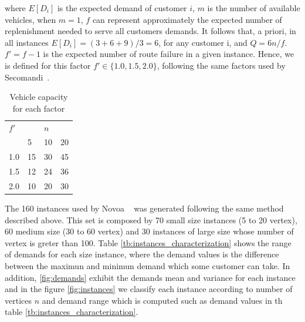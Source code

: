 where $E[D_i]$ is the expected demand of customer $i$, $m$ is the number of available vehicles, when $m = 1$, $f$ can represent approximately the expected number of replenishment needed to serve all customers demands. It follows that, a priori, in all instances $E[D_i]=(3+6+9)/3=6$, for any customer i, and $Q=6n/f$. $f'=f-1$ is the expected number of route failure in a given instance. Hence, we is defined for this factor $f' \in \{1.0, 1.5, 2.0\}$, following the same factors used by Secomandi~\cite{secomandi_comparing_2000}.

\begin{table}[!h]
  \centering
  \caption{Vehicle capacity for each factor}\label{tb:Q}
\begin{tabular}{l l l l}
  \hline
  $f'$ &   & $n$ &   \\
  \cline{2-4}
      & 5 & 10 & 20 \\
  \hline
  1.0 & 15 & 30 & 45 \\
  1.5 & 12 & 24 & 36 \\
  2.0 & 10 & 20 & 30 \\
  \hline
\end{tabular}
\end{table}



The 160 instances used by Novoa ~\cite{novoa_approximate_2009} was generated following the same method described above. This set is composed by 70 small size instances (5 to 20 vertex), 60 medium size (30 to 60 vertex) and 30 instances of large size whose number of vertex is greter than 100. Table \ref{tb:instances_characterization} shows the range of demands for each size instance, where the demand values is the difference between the maximun and minimun demand which some customer can take. In addition, \ref{fig:demands} exhibit the demands mean and variance for each instance and in the figure \ref{fig:instances} we classify each instance according to number of vertices $n$ and demand range which is computed such as demand values in th table \ref{tb:instances_characterization}.


